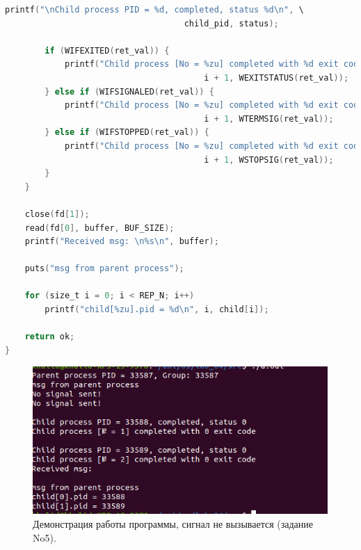\documentclass[12pt]{report}
\begin{document}
\begin{lstlisting}[label=some-code,caption=Использование сигналов,language=C]
        printf("\nChild process PID = %d, completed, status %d\n", \
                                    child_pid, status);
        
        if (WIFEXITED(ret_val)) {
            printf("Child process [No = %zu] completed with %d exit code\n", 
                                        i + 1, WEXITSTATUS(ret_val));
        } else if (WIFSIGNALED(ret_val)) {
            printf("Child process [No = %zu] completed with %d exit code\n", 
                                        i + 1, WTERMSIG(ret_val));
        } else if (WIFSTOPPED(ret_val)) {
            printf("Child process [No = %zu] completed with %d exit code\n", 
                                        i + 1, WSTOPSIG(ret_val));
        }
    }
    
    close(fd[1]);
    read(fd[0], buffer, BUF_SIZE);
    printf("Received msg: \n%s\n", buffer);

    puts("msg from parent process");
    
    for (size_t i = 0; i < REP_N; i++)
        printf("child[%zu].pid = %d\n", i, child[i]);
    
    return ok;
}
\end{lstlisting}

\begin{figure}[H]

	\centering

	\includegraphics[width=\linewidth]{img/task05_01.png}
	\caption{Демонстрация работы программы, сигнал не вызывается (задание No5).}

	\label{fig:task05_01}

\end{figure}
\end{document}
